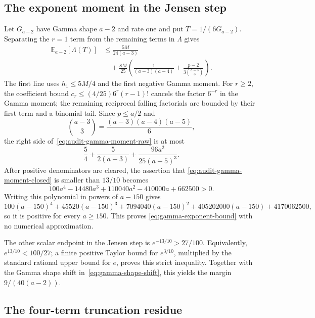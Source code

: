 \documentclass[11pt]{article}
\theoremstyle{definition}
\theoremstyle{remark}
\begin{document}
\subsection{The exponent moment in the Jensen step}

Let $G_{a-2}$ have Gamma shape $a-2$ and rate one and put
$T=1/(6G_{a-2})$.  Separating the $r=1$ term from the remaining terms in
$\Lambda$ gives
\begin{align}
 \mathbb E_{a-2}[\Lambda(T)]
 &\le \frac{5M}{24(a-3)} \\
 &\quad+
\frac{8M}{25}
 \left(
   \frac1{(a-3)(a-4)}
   +\frac{p-2}{3\binom{a-3}{3}}
 \right).                                                     \label{eq:audit-gamma-moment-raw}
\end{align}
The first line uses $h_1\le5M/4$ and the first negative Gamma moment.  For
$r\ge2$, the coefficient bound
$c_r\le(4/25)6^r(r-1)!$ cancels the factor $6^{-r}$ in the Gamma moment; the
remaining reciprocal falling factorials are bounded by their first term and a
binomial tail.  Since $p\le a/2$ and
\[
 \binom{a-3}{3}=\frac{(a-3)(a-4)(a-5)}6,
\]
the right side of~\eqref{eq:audit-gamma-moment-raw} is at most
\begin{equation}\label{eq:audit-gamma-moment-closed}
 \frac54+
\frac5{2(a-3)}+
\frac{96a^2}{25(a-5)^3}.
\end{equation}
After positive denominators are cleared, the assertion that
\eqref{eq:audit-gamma-moment-closed} is smaller than $13/10$ becomes
\[
 100a^4-14480a^3+110040a^2-410000a+662500>0.
\]
Writing this polynomial in powers of $a-150$ gives
\[
 100(a-150)^4+45520(a-150)^3+7094040(a-150)^2
 +405202000(a-150)+4170062500,
\]
so it is positive for every $a\ge150$.  This proves
\eqref{eq:gamma-exponent-bound} with no numerical approximation.

The other scalar endpoint in the Jensen step is
$e^{-13/10}>27/100$.  Equivalently, $e^{13/10}<100/27$; a finite positive
Taylor bound for $e^{3/10}$, multiplied by the standard rational upper bound
for $e$, proves this strict inequality.  Together with the Gamma shape shift
in~\eqref{eq:gamma-shape-shift}, this yields the margin
$9/(40(a-2))$.

\subsection{The four-term truncation residue}
\end{document}
